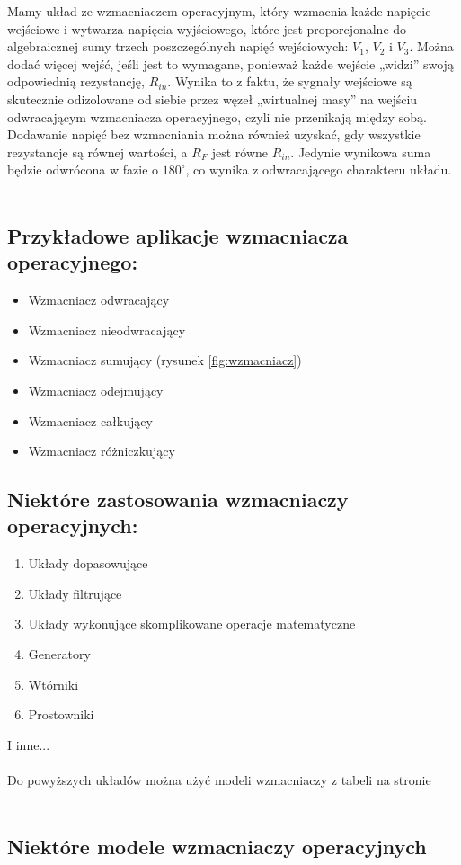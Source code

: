 \large{Mamy układ ze wzmacniaczem operacyjnym, który wzmacnia każde napięcie wejściowe i wytwarza napięcia wyjściowego, które jest proporcjonalne do algebraicznej sumy trzech poszczególnych napięć wejściowych: $V_{1}$, $V_{2}$ i $V_{3}$. Można dodać więcej wejść, jeśli jest to wymagane, ponieważ każde wejście „widzi” swoją odpowiednią rezystancję, $R_{in}$. Wynika to z faktu, że sygnały wejściowe są skutecznie odizolowane od siebie przez węzeł „wirtualnej masy” na wejściu odwracającym wzmacniacza operacyjnego, czyli nie przenikają między sobą. Dodawanie napięć bez wzmacniania można również uzyskać, gdy wszystkie rezystancje są równej wartości, a $R_{F}$ jest równe $R_{in}$. Jedynie wynikowa suma będzie odwrócona w fazie o $180^\circ$, co wynika z odwracającego charakteru układu.}
\\
\\
\subsection{Przykładowe aplikacje wzmacniacza operacyjnego:}
\begin{itemize}
  \item Wzmacniacz odwracający
  \item Wzmacniacz nieodwracający
  \item Wzmacniacz sumujący (rysunek \ref{fig:wzmacniacz})
  \item Wzmacniacz odejmujący
  \item Wzmacniacz całkujący
  \item Wzmacniacz różniczkujący
\end{itemize}

\subsection{Niektóre zastosowania wzmacniaczy operacyjnych:}
\begin{enumerate}
    \item Układy dopasowujące
    \item Układy filtrujące
    \item Układy wykonujące skomplikowane operacje matematyczne
    \item Generatory
    \item Wtórniki
    \item Prostowniki
\end{enumerate}
I inne...
\\
\\
Do powyższych układów można użyć modeli wzmacniaczy z tabeli na stronie \pageref{tab:tabelka}
\\
\\

\subsection{Niektóre modele wzmacniaczy operacyjnych}

